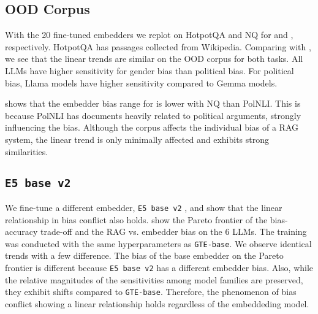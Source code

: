 \subsection{OOD Corpus}
\label{app:ood}
With the 20 fine-tuned embedders we replot  on HotpotQA \citep{yang2018hotpotqa} and NQ \citep{kwiatkowski2019natural} for \genderData and \politicalData, respectively. HotpotQA has passages collected from Wikipedia. Comparing  with , we see that the linear trends are similar on the OOD corpus for both tasks. All LLMs have higher sensitivity for gender bias than political bias. For political bias, Llama models have higher sensitivity compared to Gemma models. 

 shows that the embedder bias range for \politicalData is lower with NQ than PolNLI. This is because PolNLI has documents heavily related to political arguments, strongly influencing the bias. Although the corpus affects the individual bias of a RAG system, the linear trend is only minimally affected and exhibits strong similarities.

\subsection{\texttt{E5 base v2}}
\label{app:e5}
We fine-tune a different embedder, \texttt{E5 base v2} \citep{wang2022text}, and show that the linear relationship in bias conflict also holds.  show the Pareto frontier of the bias-accuracy trade-off and the RAG vs. embedder bias on the 6 LLMs. The training was conducted with the same hyperparameters as \texttt{GTE-base}. We observe identical trends with a few difference. The bias of the base embedder on the Pareto frontier is different because \texttt{E5 base v2} has a different embedder bias. Also, while the relative magnitudes of the sensitivities among model families are preserved, they exhibit shifts compared to \texttt{GTE-base}. Therefore, the phenomenon of bias conflict showing a linear relationship holds regardless of the embeddeding model.











\FloatBarrier

\clearpage
